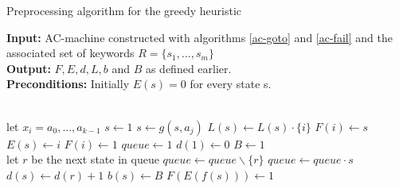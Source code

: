 \documentclass[english,twoside,censored,csm,algorithms-track-2020]{HYthesisML}
\theoremstyle{plain}
\theoremstyle{definition}
\begin{document}
  \begin{algorithm}[h!]

    \caption{Preprocessing algorithm for the greedy heuristic} \label{ukk-pre}
    \hspace*{\algorithmicindent} \textbf{Input:} AC-machine constructed with algorithms \ref{ac-goto} and \ref{ac-fail} and the associated set of keywords $R=\{s_1,...,s_m\}$ \\
    \hspace*{\algorithmicindent} \textbf{Output:} $F, E, d, L, b$ and $B$ as defined earlier.\\
    \hspace*{\algorithmicindent} \textbf{Preconditions:} Initially $E(s) = 0$ for every state s.
    
    \begin{algorithmic}[1]
         \\
          \hspace*{1.1cm plus \algorithmicindent} let $x_i = a_0,...,a_{k-1}$
          \State $s\gets 1$
            \State $s\gets g(s,a_j)$
            \State $L(s)\gets L(s) \cdot \{i\}$
              \State $F(i)\gets s$
              \State $E(s)\gets i$
                \State $F(i)\gets 1$
              \EndIf
            \EndIf
          \EndFor
        \EndFor
        \State $queue\gets 1$
        \State $d(1)\gets 0$
        \State $B\gets 1$
        \\
          \hspace*{1.1cm plus \algorithmicindent} let $r$ be the next state in queue
          \State $queue\gets queue \backslash \{r\}$
            \State $queue\gets queue\cdot s$
            \State $d(s)\gets d(r)+1$
            \State $b(s)\gets B$
            \State $F(E(f(s)))\gets 1$
          \EndFor
        \EndWhile
      \EndFunction
        
    \end{algorithmic}
  \end{algorithm}


\end{document}
